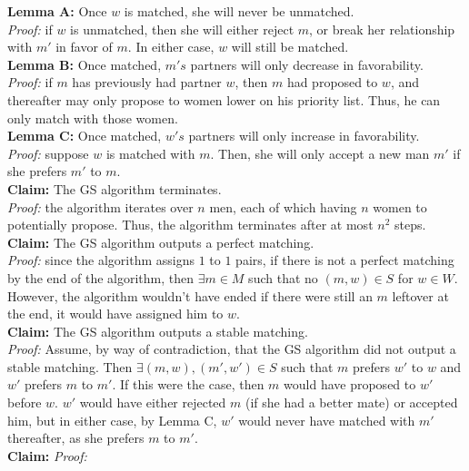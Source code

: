 \documentclass[12pt]{article}
\begin{document}
\textbf{Lemma A: }Once $w$ is matched, she will never be unmatched.\\
\emph{Proof: }if $w$ is unmatched, then she will either reject $m$, or break her relationship with $m'$ in favor of $m$. In either case, $w$ will still be matched.\\

\textbf{Lemma B: }Once matched, $m's$ partners will only decrease in favorability.\\
\emph{Proof: }if $m$ has previously had partner $w$, then $m$ had proposed to $w$, and thereafter may only propose to women lower on his priority list. Thus, he can only match with those women.\\

\textbf{Lemma C: }Once matched, $w's$ partners will only increase in favorability.\\
\emph{Proof: }suppose $w$ is matched with $m$. Then, she will only accept a new man $m'$ if she prefers $m'$ to $m$.\\

\textbf{Claim: }The GS algorithm terminates.\\
\emph{Proof:} the algorithm iterates over $n$ men, each of which having $n$ women to potentially propose. Thus, the algorithm terminates after at most $n^2$ steps.\\

\textbf{Claim: }The GS algorithm outputs a perfect matching.\\
\emph{Proof: }since the algorithm assigns $1$ to $1$ pairs, if there is not a perfect matching by the end of the algorithm, then $\exists m \in M$ such that no $(m, w) \in S$ for $w \in W$. However, the algorithm wouldn't have ended if there were still an $m$ leftover at the end, it would have assigned him to $w$. \\

\textbf{Claim: }The GS algorithm outputs a stable matching.\\
\emph{Proof: }Assume, by way of contradiction, that the GS algorithm did not output a stable matching. Then $\exists (m, w), (m', w') \in S$ such that $m$ prefers $w'$ to $w$ and $w'$ prefers $m$ to $m'$. If this were the case, then $m$ would have proposed to $w'$ before $w$. $w'$ would have either rejected $m$ (if she had a better mate) or accepted him, but in either case, by Lemma C, $w'$ would never have matched with $m'$ thereafter, as she prefers $m$ to $m'$.\\

\textbf{Claim: }
\emph{Proof: }
\end{document}
